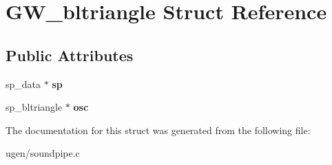 \hypertarget{structGW__bltriangle}{}\section{G\+W\+\_\+bltriangle Struct Reference}
\label{structGW__bltriangle}
\subsection*{Public Attributes}
\begin{DoxyCompactItemize}
\item 
\hypertarget{structGW__bltriangle_a4fcd9b3656edd155bd1e207222edf786}{}\label{structGW__bltriangle_a4fcd9b3656edd155bd1e207222edf786} 
sp\+\_\+data $\ast$ {\bfseries sp}
\item 
\hypertarget{structGW__bltriangle_aee2b1f81ad3be8fa65e137f9af6a14c6}{}\label{structGW__bltriangle_aee2b1f81ad3be8fa65e137f9af6a14c6} 
sp\+\_\+bltriangle $\ast$ {\bfseries osc}
\end{DoxyCompactItemize}


The documentation for this struct was generated from the following file\+:\begin{DoxyCompactItemize}
\item 
ugen/soundpipe.\+c\end{DoxyCompactItemize}
